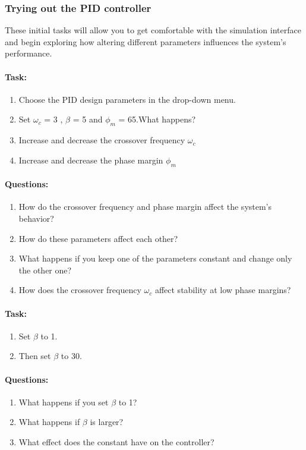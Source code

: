 \subsubsection{Trying out the PID controller}
These initial tasks will allow you to get comfortable with the simulation interface and begin exploring how altering different parameters influences the system's performance.
\paragraph{Task:}
\begin{enumerate}[]
	\item Choose the PID design parameters in the drop-down menu.
	\item Set  $\omega_c$ = 3 , $\beta$ = 5 and $\phi_m$ = 65.What happens?
	\item Increase and decrease the crossover frequency $\omega_c$
	\item Increase and decrease the phase margin $\phi_m$
\end{enumerate}
\paragraph{Questions:}
\begin{enumerate}[]
	\item How do the crossover frequency and phase margin affect the system’s behavior?
	\item How do these parameters affect each other?
	\item What happens if you keep one of the parameters constant and change only the other one?
	\item How does the crossover frequency $\omega_c$ affect stability at low phase margins?
\end{enumerate}
\paragraph{Task:}
\begin{enumerate}[]
	\item Set $\beta$ to 1.
	\item Then set $\beta$ to 30.
\end{enumerate}
\paragraph{Questions:}
\begin{enumerate}[]
	\item What happens if you set $\beta$ to 1?
	\item What happens if $\beta$ is larger?
	\item What effect does the constant have on the controller?
\end{enumerate}
